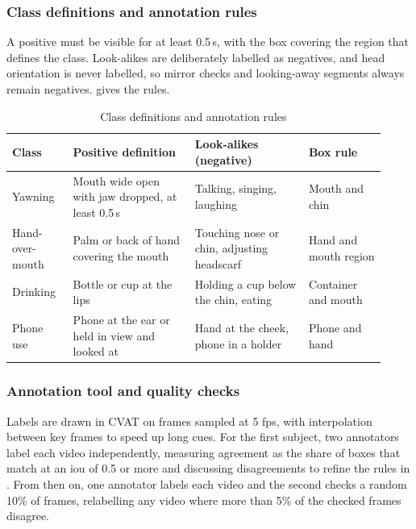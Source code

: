 \subsubsection{Class definitions and annotation rules}

A positive must be visible for at least 0.5\,s, with the box covering the region that defines the class. Look-alikes are deliberately labelled as negatives, and head orientation is never labelled, so mirror checks and looking-away segments always remain negatives.  gives the rules.

\begin{table}[htbp]
\centering
\caption{Class definitions and annotation rules}
\label{tab:ch5-02}
\footnotesize
\setlength{\tabcolsep}{3pt}
\renewcommand{\arraystretch}{1.15}
\begin{tabular}{|p{0.150\linewidth}|p{0.300\linewidth}|p{0.280\linewidth}|p{0.190\linewidth}|}
\hline
\textbf{Class} & \textbf{Positive definition} & \textbf{Look-alikes (negative)} & \textbf{Box rule} \\
\hline
Yawning & Mouth wide open with jaw dropped, at least 0.5\,s & Talking, singing, laughing & Mouth and chin \\
\hline
Hand-over-mouth & Palm or back of hand covering the mouth & Touching nose or chin, adjusting headscarf & Hand and mouth region \\
\hline
Drinking & Bottle or cup at the lips & Holding a cup below the chin, eating & Container and mouth \\
\hline
Phone use & Phone at the ear or held in view and looked at & Hand at the cheek, phone in a holder & Phone and hand \\
\hline
\end{tabular}
\end{table}

\subsubsection{Annotation tool and quality checks}

Labels are drawn in CVAT on frames sampled at 5 \gls{fps}, with interpolation between key frames to speed up long cues. For the first subject, two annotators label each video independently, measuring agreement as the share of boxes that match at an \gls{iou} of 0.5 or more and discussing disagreements to refine the rules in . From then on, one annotator labels each video and the second checks a random 10\% of frames, relabelling any video where more than 5\% of the checked frames disagree.

